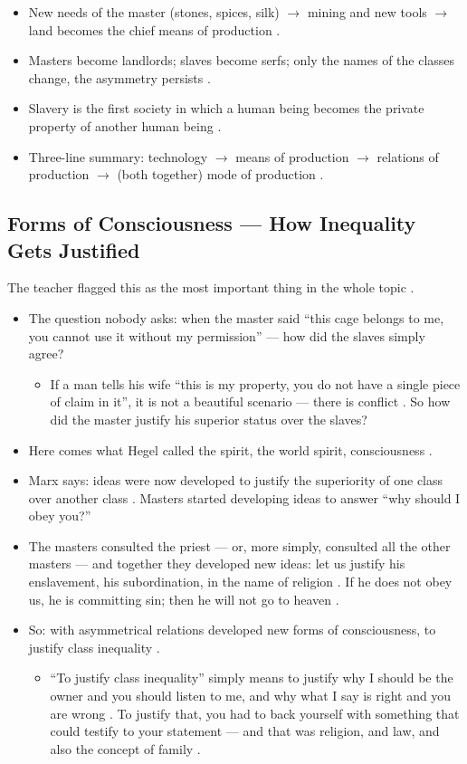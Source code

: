 \begin{QuickRevision}
\begin{itemize}
    \item New needs of the master (stones, spices, silk) $\rightarrow$ mining and new tools $\rightarrow$ land becomes the chief means of production .
    \item Masters become landlords; slaves become serfs; only the names of the classes change, the asymmetry persists .
    \item Slavery is the first society in which a human being becomes the private property of another human being .
    \item Three-line summary: technology $\rightarrow$ means of production $\rightarrow$ relations of production $\rightarrow$ (both together) mode of production .
\end{itemize}
\end{QuickRevision}

\subsection{Forms of Consciousness --- How Inequality Gets Justified}
The teacher flagged this as the most important thing in the whole topic .

\begin{itemize}
    \item The question nobody asks: when the master said ``this cage belongs to me, you cannot use it without my permission'' --- how did the slaves simply agree? 
    \begin{itemize}
        \item If a man tells his wife ``this is my property, you do not have a single piece of claim in it'', it is not a beautiful scenario --- there is conflict . So how did the master justify his superior status over the slaves? 
    \end{itemize}
    \item Here comes what Hegel called the spirit, the world spirit, consciousness .
    \item Marx says: ideas were now developed to justify the superiority of one class over another class . Masters started developing ideas to answer ``why should I obey you?'' 
    \item The masters consulted the priest --- or, more simply, consulted all the other masters --- and together they developed new ideas: let us justify his enslavement, his subordination, in the name of religion . If he does not obey us, he is committing sin; then he will not go to heaven .
    \item So: with asymmetrical relations developed new forms of consciousness, to justify class inequality .
    \begin{itemize}
        \item ``To justify class inequality'' simply means to justify why I should be the owner and you should listen to me, and why what I say is right and you are wrong . To justify that, you had to back yourself with something that could testify to your statement --- and that was religion, and law, and also the concept of family .
    \end{itemize}
\end{itemize}

